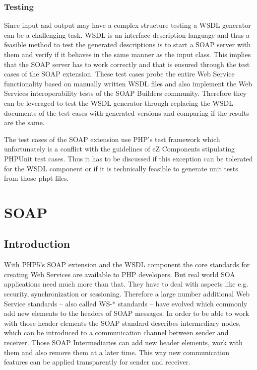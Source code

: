 \documentclass[10pt,final,a4paper,oneside]{article}
\begin{document}
\subsubsection{Testing}
Since input and output may have a complex structure
testing a WSDL generator can be a challenging task.
WSDL is an interface description language
and thus a feasible method to test the generated descriptions
is to start a SOAP server with them
and verify if it behaves in the same manner as the input class.
This implies that the SOAP server has to work correctly
and that is ensured through the test cases of the SOAP extension.
These test cases probe the entire Web Service functionality
based on manually written WSDL files and also implement the
Web Services interoperability tests of the SOAP Builders community.
Therefore they can be leveraged to test the WSDL generator
through replacing the WSDL documents of the test cases
with generated versions
and comparing if the results are the same.

The test cases of the SOAP extension use PHP's test framework
which unfortunately is a conflict with the guidelines of eZ Components
stipulating PHPUnit test cases.
Thus it has to be discussed
if this exception can be tolerated for the WSDL component
or if it is technically feasible to generate unit tests
from those phpt files.





\section{SOAP}\label{sec:SOAP}
%
\subsection{Introduction}
With PHP5's SOAP extension and the WSDL component
the core standards for creating Web Services
are available to PHP developers.
But real world SOA applications need much more than that.
They have to deal with aspects
like e.g. security, synchronization or sessioning.
Therefore a large number additional Web Service standards
-- also called WS-* standards --
have evolved which commonly add new elements
to the headers of SOAP messages.
In order to be able to work with those header elements
the SOAP standard describes intermediary nodes,
which can be introduced to a communication channel
between sender and receiver.
Those SOAP Intermediaries
can add new header elements, work with them
and also remove them at a later time.
This way new communication features can be applied
transparently for sender and receiver.
\end{document}
